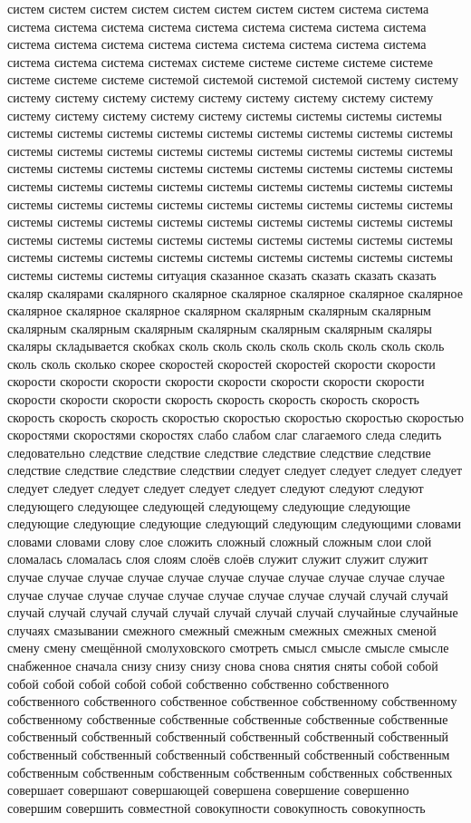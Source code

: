 систем систем систем систем систем систем систем систем система система система система система система система система система система система система система система система система система система система система система система система системах системе системе системе системе системе системе системе системе системой системой системой системой систему систему систему систему систему систему систему систему систему систему систему систему систему систему систему систему системы системы системы системы системы системы системы системы системы системы системы системы системы системы системы системы системы системы системы системы системы системы системы системы системы системы системы системы системы системы системы системы системы системы системы системы системы системы системы системы системы системы системы системы системы системы системы системы системы системы системы системы системы системы системы системы системы системы системы системы системы системы системы системы системы системы системы системы системы системы системы системы системы системы системы системы системы системы системы ситуация сказанное сказать сказать сказать сказать скаляр скалярами скалярного скалярное скалярное скалярное скалярное скалярное скалярное скалярное скалярное скалярном скалярным скалярным скалярным скалярным скалярным скалярным скалярным скалярным скалярным скаляры скаляры складывается скобках сколь сколь сколь сколь сколь сколь сколь сколь сколь сколь сколько скорее скоростей скоростей скоростей скорости скорости скорости скорости скорости скорости скорости скорости скорости скорости скорости скорости скорости скорость скорость скорость скорость скорость скорость скорость скорость скоростью скоростью скоростью скоростью скоростью скоростями скоростями скоростях слабо слабом слаг слагаемого следа следить следовательно следствие следствие следствие следствие следствие следствие следствие следствие следствие следствии следует следует следует следует следует следует следует следует следует следует следует следуют следуют следуют следующего следующее следующей следующему следующие следующие следующие следующие следующие следующий следующим следующими словами словами словами слову слое сложить сложный сложный сложным слои слой сломалась сломалась слоя слоям слоёв слоёв служит служит служит служит случае случае случае случае случае случае случае случае случае случае случае случае случае случае случае случае случае случае случае случай случай случай случай случай случай случай случай случай случай случай случайные случайные случаях смазывании смежного смежный смежным смежных смежных сменой смену смену смещённой смолуховского смотреть смысл смысле смысле смысле снабженное сначала снизу снизу снизу снова снова снятия сняты собой собой собой собой собой собой собой собственно собственно собственного собственного собственного собственное собственное собственному собственному собственному собственные собственные собственные собственные собственные собственный собственный собственный собственный собственный собственный собственный собственный собственный собственный собственный собственным собственным собственным собственным собственным собственных собственных совершает совершают совершающей совершена совершение совершенно совершим совершить совместной совокупности совокупность совокупность 